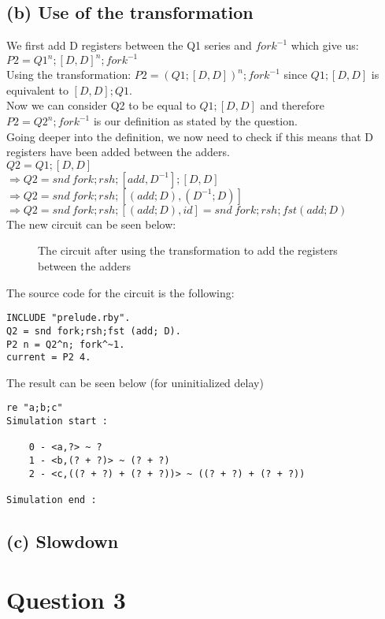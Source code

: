 \documentclass[a4paper,10pt]{article}
\begin{document}
\subsection*{(b) Use of the transformation}
We first add D registers between the Q1 series and $fork^{-1}$ which give us: $P2=Q1^n;[D,D]^n;fork^{-1}$\\[0.25cm] 
Using the transformation: $P2=(Q1;[D,D])^n;fork^{-1}$ since $Q1;[D,D]$ is equivalent to $[D,D];Q1$.\\[0.25cm] 
Now we can consider Q2 to be equal to $Q1;[D,D]$ and therefore $P2 = Q2^n;fork^{-1}$ is our definition as stated by the question.\\[0.25cm] 
Going deeper into the definition, we now need to check if this means that D registers have been added between the adders. \\[0.25cm] 
$Q2 = Q1;[D,D] $\\[0.25cm]
$\Rightarrow Q2 = snd\: fork;rsh;[add,D^{-1}];[D,D]$ \\[0.25cm]
$\Rightarrow Q2 = snd\: fork;rsh;[(add;D),(D^{-1};D)] $ \\[0.25cm]
$\Rightarrow Q2 = snd\: fork;rsh;[(add;D),id] = snd\: fork;rsh;fst(add;D)$
\\[0.5cm]
The new circuit can be seen below:
\begin{figure}[H]
\begin{center}

\caption{The circuit after using the transformation to add the registers between the adders}
\end{center}
\end{figure}
The source code for the circuit is the following:
\begin{Verbatim}
INCLUDE "prelude.rby".
Q2 = snd fork;rsh;fst (add; D).
P2 n = Q2^n; fork^~1. 
current = P2 4.
\end{Verbatim}
The result can be seen below (for uninitialized delay)
\begin{Verbatim}
re "a;b;c"
Simulation start :

    0 - <a,?> ~ ?
    1 - <b,(? + ?)> ~ (? + ?)
    2 - <c,((? + ?) + (? + ?))> ~ ((? + ?) + (? + ?))

Simulation end :
\end{Verbatim}

\subsection*{(c) Slowdown}



\section*{Question 3}
\end{document}
